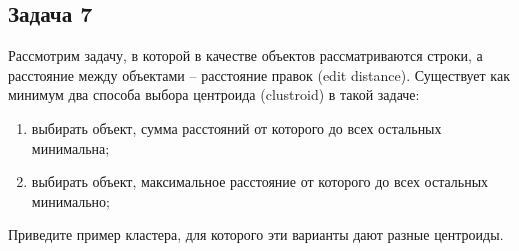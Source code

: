 \documentclass[12pt,a4paper]{article}
\begin{document}
\subsection*{Задача 7}

Рассмотрим задачу, в которой в качестве объектов рассматриваются строки, а расстояние между объектами -- расстояние правок (edit distance). Существует как минимум два способа выбора центроида (clustroid) в такой задаче: 
\begin{enumerate}
\item выбирать объект, сумма расстояний от которого до всех остальных минимальна;
\item выбирать объект, максимальное расстояние от которого до всех остальных минимально;
\end{enumerate}
Приведите пример кластера, для которого эти варианты дают разные центроиды.
\end{document}
